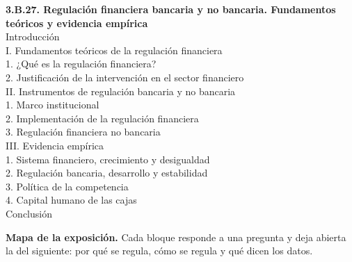\documentclass[11pt]{article}
\begin{document}
\begin{esquema}
\textbf{3.B.27. Regulación financiera bancaria y no bancaria. Fundamentos teóricos y evidencia empírica}\\[2pt]
Introducción\\
I. Fundamentos teóricos de la regulación financiera\\
\hspace*{1.5em}1. ¿Qué es la regulación financiera?\\
\hspace*{1.5em}2. Justificación de la intervención en el sector financiero\\
II. Instrumentos de regulación bancaria y no bancaria\\
\hspace*{1.5em}1. Marco institucional\\
\hspace*{1.5em}2. Implementación de la regulación financiera\\
\hspace*{1.5em}3. Regulación financiera no bancaria\\
III. Evidencia empírica\\
\hspace*{1.5em}1. Sistema financiero, crecimiento y desigualdad\\
\hspace*{1.5em}2. Regulación bancaria, desarrollo y estabilidad\\
\hspace*{1.5em}3. Política de la competencia\\
\hspace*{1.5em}4. Capital humano de las cajas\\
Conclusión
\end{esquema}

\begin{anotaciones}
\textbf{Mapa de la exposición.} Cada bloque responde a una pregunta y deja abierta la del siguiente: por qué se regula, cómo se regula y qué dicen los datos.
\begin{infografiacaja}
\caption{Mapa del tema: la pregunta de cada bloque y el hilo que los une}\label{figu:mapa-tema}
\end{infografiacaja}
\end{anotaciones}
\end{document}
